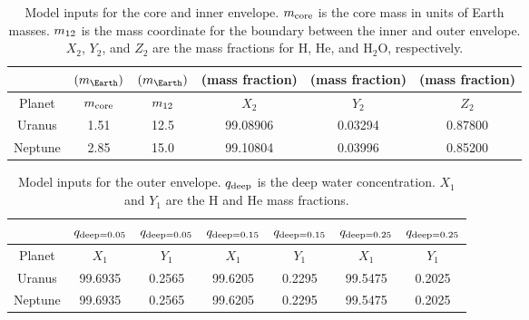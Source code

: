 \documentclass[11pt]{ucscthesisbs}
\begin{document}
\begin{table}[]
\centering
\begin{tabular}{cccccc}
                              & $(m_{\Earth})$                      & $(m_{\Earth})$                    & (mass fraction)               & (mass fraction)              & (mass fraction)              \\ \hline
\multicolumn{1}{|c|}{Planet}  & \multicolumn{1}{c|}{$m_{\rm core}$} & \multicolumn{1}{c|}{$m_{\rm 12}$} & \multicolumn{1}{c|}{$X_{2}$}  & \multicolumn{1}{c|}{$Y_{2}$} & \multicolumn{1}{c|}{$Z_{2}$} \\ \hline
\multicolumn{1}{|c|}{Uranus}  & \multicolumn{1}{c|}{1.51}           & \multicolumn{1}{c|}{12.5}         & \multicolumn{1}{c|}{99.08906} & \multicolumn{1}{c|}{0.03294} & \multicolumn{1}{c|}{0.87800} \\ \hline
\multicolumn{1}{|c|}{Neptune} & \multicolumn{1}{c|}{2.85}           & \multicolumn{1}{c|}{15.0}         & \multicolumn{1}{c|}{99.10804} & \multicolumn{1}{c|}{0.03996} & \multicolumn{1}{c|}{0.85200} \\ \hline
\end{tabular}
\caption{Model inputs for the core and inner envelope. $m_{\rm core}$ is the core mass in units of Earth masses. $m_{\rm 12}$ is the mass coordinate for the boundary between the inner and outer envelope. $X_{2}$, $Y_{2}$, and $Z_{2}$ are the mass fractions for H, He, and H$_{2}$O, respectively.}
\label{tab:core_mass_and_inner_envelope_mass_fractions}
\end{table}

\begin{table}[]
\centering
\begin{tabular}{ccccccc}
                              & $q_{\rm deep = 0.05}$        & $q_{\rm deep = 0.05}$        & $q_{\rm deep = 0.15}$        & $q_{\rm deep = 0.15}$        & $q_{\rm deep = 0.25}$        & $q_{\rm deep = 0.25}$        \\ \hline
\multicolumn{1}{|c|}{Planet}  & \multicolumn{1}{c|}{$X_{1}$} & \multicolumn{1}{c|}{$Y_{1}$} & \multicolumn{1}{c|}{$X_{1}$} & \multicolumn{1}{c|}{$Y_{1}$} & \multicolumn{1}{c|}{$X_{1}$} & \multicolumn{1}{c|}{$Y_{1}$} \\ \hline
\multicolumn{1}{|c|}{Uranus}  & \multicolumn{1}{c|}{99.6935} & \multicolumn{1}{c|}{0.2565}  & \multicolumn{1}{c|}{99.6205} & \multicolumn{1}{c|}{0.2295}  & \multicolumn{1}{c|}{99.5475} & \multicolumn{1}{c|}{0.2025}  \\ \hline
\multicolumn{1}{|c|}{Neptune} & \multicolumn{1}{c|}{99.6935} & \multicolumn{1}{c|}{0.2565}  & \multicolumn{1}{c|}{99.6205} & \multicolumn{1}{c|}{0.2295}  & \multicolumn{1}{c|}{99.5475} & \multicolumn{1}{c|}{0.2025}  \\ \hline
\end{tabular}
\caption{Model inputs for the outer envelope. $q_{\rm deep}$ is the deep water concentration. $X_{1}$ and $Y_{1}$ are the H and He mass fractions.}
\label{tab:outer_envelope_mass_fractions}
\end{table}
\end{document}
